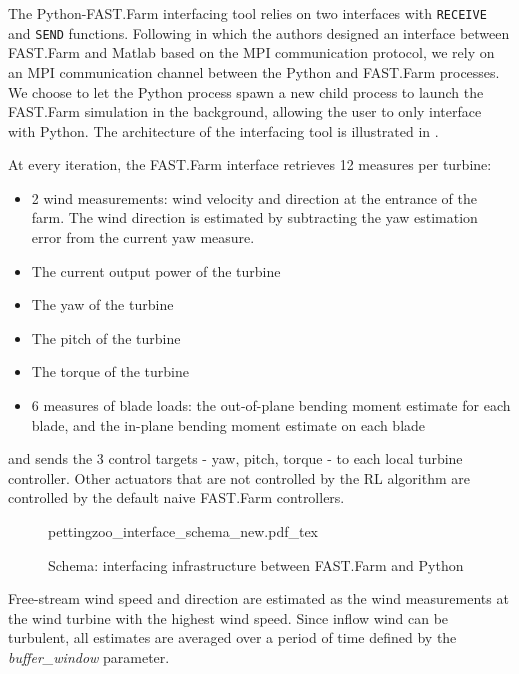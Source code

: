 \documentclass{article}
\begin{document}
The Python-FAST.Farm interfacing tool relies on two interfaces with \texttt{RECEIVE} and \texttt{SEND} functions. Following \cite{Smits2023interface} in which the authors designed an interface between FAST.Farm and Matlab based on the MPI communication protocol, we rely on an MPI communication channel between the Python and FAST.Farm processes. We choose to let the Python process spawn a new child process to launch the FAST.Farm simulation in the background, allowing the user to only interface with Python. The architecture of the interfacing tool is illustrated in .

At every iteration, the FAST.Farm interface retrieves 12 measures per turbine:
\begin{itemize}
    \item 2 wind measurements: wind velocity and direction at the entrance of the farm. The wind direction is estimated by subtracting the yaw estimation error from the current yaw measure.
    \item The current output power of the turbine
    \item The yaw of the turbine
    \item The pitch of the turbine
    \item The torque of the turbine
    \item 6 measures of blade loads: the out-of-plane bending moment estimate for each blade, and the in-plane bending moment estimate on each blade
\end{itemize}

and sends the 3 control targets - yaw, pitch, torque -  to each local turbine controller. Other actuators that are not controlled by the RL algorithm are controlled by the default naive FAST.Farm controllers.


\begin{figure}[!htb]
    \centering
    \def\svgwidth{\columnwidth}
    {pettingzoo_interface_schema_new.pdf_tex}
    \caption{Schema: interfacing infrastructure between FAST.Farm and Python}
    \label{fig:fastfarm-interface}
\end{figure}
Free-stream wind speed and direction are estimated as the wind measurements at the wind turbine with the highest wind speed. Since inflow wind can be turbulent, all estimates are averaged over a period of time defined by the \textit{buffer\_window} parameter.
\newpage
\end{document}

